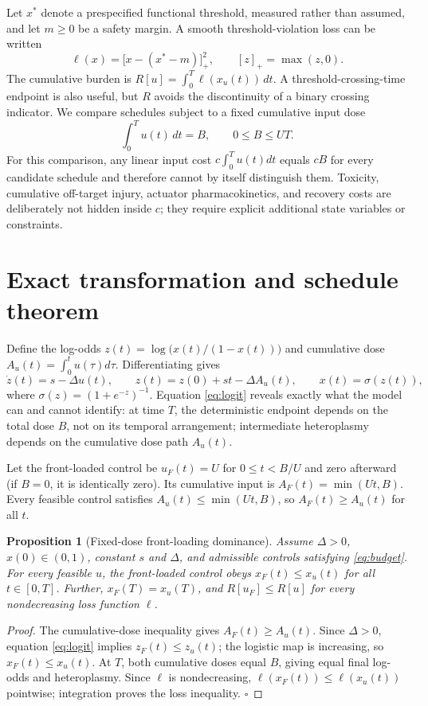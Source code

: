 \documentclass[11pt]{article}
\newtheorem{proposition}{Proposition}
\begin{document}
Let $x^*$ denote a prespecified functional threshold, measured rather than assumed, and let $m\geq0$ be a safety margin. A smooth threshold-violation loss can be written
\begin{equation}
\ell(x)=\bigl[x-(x^*-m)\bigr]_+^2,\qquad [z]_+=\max(z,0).
\end{equation}
The cumulative burden is $R[u]=\int_0^T\ell(x_u(t))\,dt$. A threshold-crossing-time endpoint is also useful, but $R$ avoids the discontinuity of a binary crossing indicator. We compare schedules subject to a fixed cumulative input dose
\begin{equation}
\int_0^T u(t)\,dt=B,\qquad 0\leq B\leq UT. \label{eq:budget}
\end{equation}
For this comparison, any linear input cost $c\int_0^T u(t)dt$ equals $cB$ for every candidate schedule and therefore cannot by itself distinguish them. Toxicity, cumulative off-target injury, actuator pharmacokinetics, and recovery costs are deliberately not hidden inside $c$; they require explicit additional state variables or constraints.

\section{Exact transformation and schedule theorem}
Define the log-odds $z(t)=\log\bigl(x(t)/(1-x(t))\bigr)$ and cumulative dose $A_u(t)=\int_0^t u(\tau)d\tau$. Differentiating gives
\begin{equation}
\dot z(t)=s-\Delta u(t),\qquad z(t)=z(0)+st-\Delta A_u(t),\qquad x(t)=\sigma(z(t)),
\label{eq:logit}
\end{equation}
where $\sigma(z)=(1+e^{-z})^{-1}$. Equation \eqref{eq:logit} reveals exactly what the model can and cannot identify: at time $T$, the deterministic endpoint depends on the total dose $B$, not on its temporal arrangement; intermediate heteroplasmy depends on the cumulative dose path $A_u(t)$.

Let the front-loaded control be $u_F(t)=U$ for $0\leq t<B/U$ and zero afterward (if $B=0$, it is identically zero). Its cumulative input is $A_F(t)=\min(Ut,B)$. Every feasible control satisfies $A_u(t)\leq\min(Ut,B)$, so $A_F(t)\geq A_u(t)$ for all $t$.

\begin{proposition}[Fixed-dose front-loading dominance]
Assume $\Delta>0$, $x(0)\in(0,1)$, constant $s$ and $\Delta$, and admissible controls satisfying \eqref{eq:budget}. For every feasible $u$, the front-loaded control obeys $x_F(t)\leq x_u(t)$ for all $t\in[0,T]$. Further, $x_F(T)=x_u(T)$, and $R[u_F]\leq R[u]$ for every nondecreasing loss function $\ell$.
\end{proposition}
\begin{proof}
The cumulative-dose inequality gives $A_F(t)\geq A_u(t)$. Since $\Delta>0$, equation \eqref{eq:logit} implies $z_F(t)\leq z_u(t)$; the logistic map is increasing, so $x_F(t)\leq x_u(t)$. At $T$, both cumulative doses equal $B$, giving equal final log-odds and heteroplasmy. Since $\ell$ is nondecreasing, $\ell(x_F(t))\leq\ell(x_u(t))$ pointwise; integration proves the loss inequality. $\square$
\end{proof}
\end{document}
